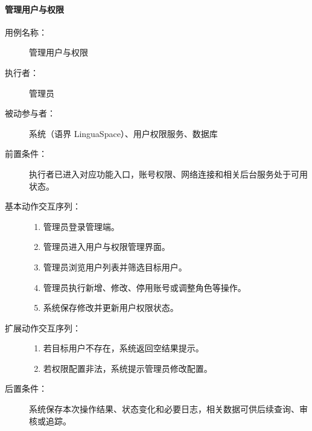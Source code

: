 \paragraph{管理用户与权限}
\begin{description}
  \item[用例名称：] 管理用户与权限
  \item[执行者：] 管理员
  \item[被动参与者：] 系统（语界 LinguaSpace）、用户权限服务、数据库
  \item[前置条件：] 执行者已进入对应功能入口，账号权限、网络连接和相关后台服务处于可用状态。
  \item[基本动作交互序列：]
  \begin{enumerate}
    \item 管理员登录管理端。
    \item 管理员进入用户与权限管理界面。
    \item 管理员浏览用户列表并筛选目标用户。
    \item 管理员执行新增、修改、停用账号或调整角色等操作。
    \item 系统保存修改并更新用户权限状态。
  \end{enumerate}
  \item[扩展动作交互序列：]
  \begin{enumerate}
    \item[3a.] 若目标用户不存在，系统返回空结果提示。
    \item[4a.] 若权限配置非法，系统提示管理员修改配置。
  \end{enumerate}
  \item[后置条件：] 系统保存本次操作结果、状态变化和必要日志，相关数据可供后续查询、审核或追踪。
\end{description}

